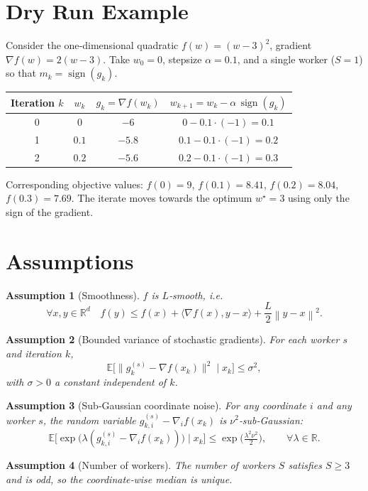 \documentclass[11pt]{article}
\newcommand{\E}{\mathbb{E}}
\newcommand{\R}{\mathbb{R}}
\newcommand{\sign}{\operatorname{sign}}
\newcommand{\norm}[1]{\left\lVert #1\right\rVert}
\newtheorem{assumption}{Assumption}
\begin{document}
\section*{Dry Run Example}
Consider the one‑dimensional quadratic $f(w)=(w-3)^{2}$, gradient $\nabla f(w)=2(w-3)$.  
Take $w_{0}=0$, stepsize $\alpha=0.1$, and a single worker ($S=1$) so that $m_{k}=\sign(g_{k})$.

\begin{center}
\begin{tabular}{c|c|c|c}
Iteration $k$ & $w_{k}$ & $g_{k}= \nabla f(w_{k})$ & $w_{k+1}=w_{k}-\alpha\,\sign(g_{k})$\\ \hline
0 & $0$ & $-6$ & $0-0.1\cdot(-1)=0.1$\\
1 & $0.1$ & $-5.8$ & $0.1-0.1\cdot(-1)=0.2$\\
2 & $0.2$ & $-5.6$ & $0.2-0.1\cdot(-1)=0.3$\\
\end{tabular}
\end{center}

Corresponding objective values: $f(0)=9$, $f(0.1)=8.41$, $f(0.2)=8.04$, $f(0.3)=7.69$.  
The iterate moves towards the optimum $w^{\star}=3$ using only the sign of the gradient.

\newpage
\section*{Assumptions}
\begin{assumption}[Smoothness]\label{ass:smooth}
$f$ is $L$‑smooth, i.e.
\[
    \forall x,y\in\R^{d}\quad
    f(y)\le f(x)+\langle \nabla f(x),y-x\rangle+\frac{L}{2}\norm{y-x}^{2}.
\]
\end{assumption}
\begin{assumption}[Bounded variance of stochastic gradients]\label{ass:var}
For each worker $s$ and iteration $k$,
\[
    \E\big[\|g^{(s)}_{k}-\nabla f(x_{k})\|^{2}\mid x_{k}\big]\le \sigma^{2},
\]
with $\sigma>0$ a constant independent of $k$.
\end{assumption}
\begin{assumption}[Sub‑Gaussian coordinate noise]\label{ass:subg}
For any coordinate $i$ and any worker $s$, the random variable
$g^{(s)}_{k,i}-\nabla_{i}f(x_{k})$ is $\nu^{2}$‑sub‑Gaussian:
\[
    \E\!\Big[\exp\big(\lambda (g^{(s)}_{k,i}-\nabla_{i}f(x_{k}))\big)\mid x_{k}\Big]
    \le \exp\!\big(\tfrac{\lambda^{2}\nu^{2}}{2}\big),\qquad\forall\lambda\in\R .
\]
\end{assumption}
\begin{assumption}[Number of workers]\label{ass:workers}
The number of workers $S$ satisfies $S\ge 3$ and is odd, so the coordinate‑wise median is unique.
\end{assumption}
\end{document}
